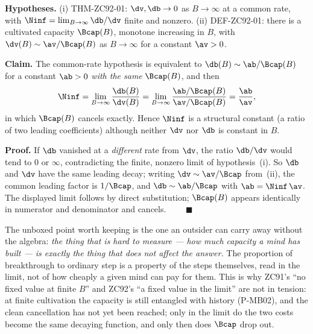 \documentclass[12pt, a4paper]{article}
\begin{document}
\begin{formalbox}[title={THM-ZC93-01: Capacity-Cancellation
  (Exact; closes the structural half of GAP-ZC92-01)}]
\textbf{Hypotheses.} (i) THM-ZC92-01: $\dv,\db\to0$ as $B\to\infty$ at a
common rate, with $\Ninf=\lim_{B\to\infty}\db/\dv$ finite and nonzero.
(ii) DEF-ZC92-01: there is a cultivated capacity $\Bcap(B)$, monotone
increasing in $B$, with $\dv(B)\sim\av/\Bcap(B)$ as $B\to\infty$ for a
constant $\av>0$.

\textbf{Claim.} The common-rate hypothesis is equivalent to
$\db(B)\sim\ab/\Bcap(B)$ for a constant $\ab>0$ \emph{with the same}
$\Bcap(B)$, and then
\[
  \Ninf=\lim_{B\to\infty}\frac{\db(B)}{\dv(B)}
       =\lim_{B\to\infty}\frac{\ab/\Bcap(B)}{\av/\Bcap(B)}
       =\frac{\ab}{\av},
\]
in which $\Bcap(B)$ cancels exactly. Hence $\Ninf$ is a structural constant
(a ratio of two leading coefficients) although neither $\dv$ nor $\db$ is
constant in $B$.

\textbf{Proof.} If $\db$ vanished at a \emph{different} rate from $\dv$, the
ratio $\db/\dv$ would tend to $0$ or $\infty$, contradicting the finite,
nonzero limit of hypothesis~(i). So $\db$ and $\dv$ have the same leading
decay; writing $\dv\sim\av/\Bcap$ from~(ii), the common leading factor is
$1/\Bcap$, and $\db\sim\ab/\Bcap$ with $\ab=\Ninf\,\av$. The displayed limit
follows by direct substitution; $\Bcap(B)$ appears identically in numerator
and denominator and cancels. $\qquad\blacksquare$
\end{formalbox}

The unboxed point worth keeping is the one an outsider can carry away without
the algebra: \emph{the thing that is hard to measure --- how much capacity a
mind has built --- is exactly the thing that does not affect the answer.} The
proportion of breakthrough to ordinary step is a property of the steps
themselves, read in the limit, not of how cheaply a given mind can pay for
them. This is why ZC91's ``no fixed value at finite $B$'' and ZC92's ``a fixed
value in the limit'' are not in tension: at finite cultivation the capacity is
still entangled with history (P-MB02), and the clean cancellation has not yet
been reached; only in the limit do the two costs become the same decaying
function, and only then does $\Bcap$ drop out.

\end{document}
